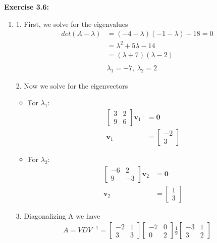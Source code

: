 \documentclass[12pt]{article}
\begin{document}
\noindent \textbf{Exercise 3.6:}

\begin{enumerate}
  \item [(a)]

        1. First, we solve for the eigenvalues
        \begin{align*}
          det(A - \lambda{}) & = (-4-\lambda{})(-1-\lambda{}) -18 = 0 \\
                             & = \lambda^{2} + 5\lambda{} -14         \\
                             & = (\lambda+7)(\lambda-2)               \\\\
                             & \lambda_{1} = -7,~ \lambda_{2} = 2
        \end{align*}

        2. Now we solve for the eigenvectors
        \begin{itemize}
          \item For $\lambda_{1}$:
                \begin{align*}
                  \begin{bmatrix} 3 & 2 \\ 9 & 6 \end{bmatrix} \mathbf{v}_1 & = \mathbf{0}                            \\
                  \mathbf{v}_1                                              & = \begin{bmatrix} -2 \\ 3 \end{bmatrix}
                \end{align*}
          \item  For $\lambda_{2}$:
                \begin{align*}
                  \begin{bmatrix} -6 & 2 \\ 9 & -3 \end{bmatrix}\mathbf{v}_2 & = \mathbf{0}                           \\
                  \mathbf{v}_2                                               & = \begin{bmatrix} 1 \\ 3 \end{bmatrix}
                \end{align*}
        \end{itemize}

        3. Diagonalizing A we have
        \begin{align*}
          A = VDV^{-1} = \begin{bmatrix} -2 & 1 \\ 3 & 3\end{bmatrix} \begin{bmatrix} -7 & 0 \\ 0 & 2 \end{bmatrix}\frac{1}{9}\begin{bmatrix} -3 & 1 \\ 3 & 2 \end{bmatrix}
        \end{align*}


\end{enumerate}
\end{document}
